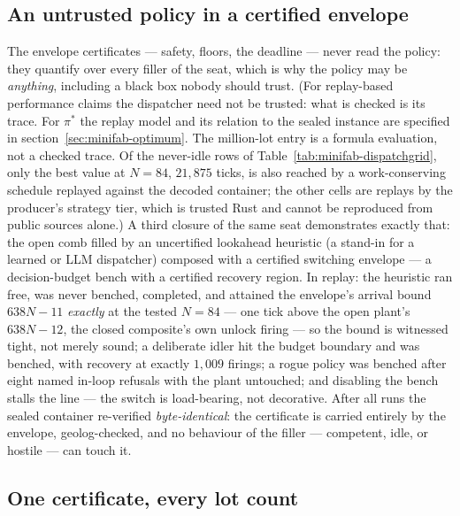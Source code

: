 \subsection{An untrusted policy in a certified envelope}
\label{sec:minifab-envelope}

The envelope certificates --- safety, floors, the deadline ---
never read the policy: they quantify over every filler of the seat,
which is why the policy may be \emph{anything}, including a black
box nobody should trust. (For replay-based performance claims the dispatcher need not be
trusted: what is checked is its trace. For $\pi^{\ast}$ the replay
model and its relation to the sealed instance are specified in
section~\ref{sec:minifab-optimum}. The million-lot entry is a
formula evaluation, not a checked trace. Of the never-idle rows of
Table~\ref{tab:minifab-dispatchgrid}, only the best value at
$N = 84$, $21{,}875$ ticks, is also reached by a work-conserving
schedule replayed against the decoded container; the other cells
are replays by the producer's strategy tier, which is trusted Rust
and cannot be reproduced from public sources alone.) A third closure of the same seat
demonstrates exactly that:
the open comb filled by an uncertified lookahead heuristic (a
stand-in for a learned or LLM dispatcher) composed with a certified
switching envelope --- a decision-budget bench with a certified
recovery region. In replay: the heuristic ran free, was never
benched, completed, and attained the envelope's arrival bound
$638N - 11$ \emph{exactly} at the tested $N = 84$ --- one tick
above the open plant's $638N - 12$, the closed composite's own
unlock firing --- so the bound is witnessed tight, not merely
sound; a deliberate idler hit the budget boundary and was benched,
with recovery at exactly $1{,}009$ firings; a rogue policy was
benched after eight named in-loop refusals with the plant
untouched; and disabling the bench stalls the line --- the switch
is load-bearing, not decorative. After all runs the sealed
container re-verified \emph{byte-identical}: the certificate is
carried entirely by the envelope, geolog-checked, and no behaviour
of
the filler --- competent, idle, or hostile --- can touch it.

\subsection{One certificate, every lot count}
\label{sec:minifab-nscaling}


